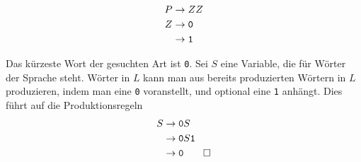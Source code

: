 \begin{loesung}
\begin{teilaufgaben}
\begin{align*}
P&\rightarrow ZZ\\
Z&\rightarrow {\tt 0}\\
 &\rightarrow {\tt 1}
\end{align*}
\item
Das kürzeste Wort der gesuchten Art ist {\tt 0}. Sei $S$ eine
Variable, die für Wörter der Sprache steht. Wörter in $L$
kann man aus bereits produzierten Wörtern in $L$ produzieren,
indem man  eine {\tt 0} voranstellt, und optional eine {\tt 1}
anhängt. Dies führt auf die Produktionsregeln
\begin{align*}
S&\rightarrow {\tt 0}S\\
 &\rightarrow {\tt 0}S{\tt 1}\\
 &\rightarrow {\tt 0}
\qedhere
\end{align*}
\end{teilaufgaben}
\end{loesung}
